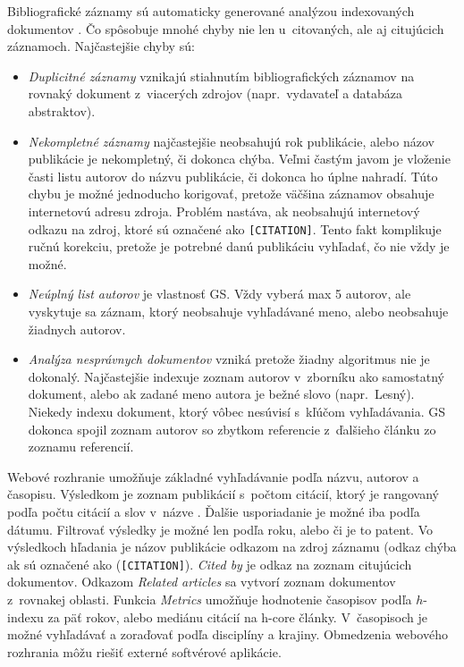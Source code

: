 Bibliografické záznamy sú automaticky generované analýzou indexovaných
dokumentov \citep{Vine2006}.  Čo spôsobuje mnohé chyby nie len u~citovaných, ale
aj citujúcich záznamoch.  Najčastejšie chyby sú:
\begin{itemize}
\item \emph{Duplicitné záznamy} vznikajú stiahnutím bibliografických záznamov na
  rovnaký dokument z~viacerých zdrojov (napr.~vydavateľ a databáza abstraktov).
\item \emph{Nekompletné záznamy} najčastejšie neobsahujú rok publikácie, alebo
  názov publikácie je nekompletný, či dokonca chýba.  Veľmi častým javom je
  vloženie časti listu autorov do názvu publikácie, či dokonca ho úplne nahradí.
  Túto chybu je možné jednoducho korigovať, pretože väčšina záznamov obsahuje
  internetovú adresu zdroja.  Problém nastáva, ak neobsahujú internetový odkazu
  na zdroj, ktoré sú označené ako \texttt{[CITATION]}.  Tento fakt komplikuje
  ručnú korekciu, pretože je potrebné danú publikáciu vyhľadať, čo nie vždy je
  možné.
\item \emph{Neúplný list autorov} je vlastnosť GS.  Vždy vyberá max 5 autorov,
  ale vyskytuje sa záznam, ktorý neobsahuje vyhľadávané meno, alebo neobsahuje
  žiadnych autorov.
\item \emph{Analýza nesprávnych dokumentov} vzniká pretože žiadny algoritmus nie
  je dokonalý.  Najčastejšie indexuje zoznam autorov v~zborníku ako samostatný
  dokument, alebo ak zadané meno autora je bežné slovo (napr.~Lesný).  Niekedy
  indexu dokument, ktorý vôbec nesúvisí s~kľúčom vyhľadávania.  GS dokonca
  spojil zoznam autorov so zbytkom referencie z~ďalšieho článku zo zoznamu
  referencií.
\end{itemize}

\noindent Webové rozhranie umožňuje základné vyhľadávanie podľa názvu, autorov a
časopisu.  Výsledkom je zoznam publikácií s~počtom citácií, ktorý je rangovaný
podľa počtu citácií a slov v~názve \citep{Beel2009}.  Ďalšie usporiadanie je
možné iba podľa dátumu.  Filtrovať výsledky je možné len podľa roku, alebo či je
to patent.  Vo výsledkoch hľadania je názov publikácie odkazom na zdroj záznamu
(odkaz chýba ak sú označené ako (\texttt{[CITATION]}).  \emph{Cited by} je odkaz
na zoznam citujúcich dokumentov.  Odkazom \emph{Related articles} sa vytvorí
zoznam dokumentov z~rovnakej oblasti.  Funkcia \emph{Metrics} umožňuje
hodnotenie časopisov podľa $h$-indexu za päť rokov, alebo mediánu citácií na
h-core články.  V~časopisoch je možné vyhľadávať a zoraďovať podľa disciplíny a
krajiny.  Obmedzenia webového rozhrania môžu riešiť externé softvérové
aplikácie.

